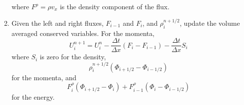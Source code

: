 \documentclass{article}
\begin{document}
\begin{enumerate}
\begin{equation}
	\end{equation}
	where $F^\rho = \rho v_x$ is the density component of the flux. 
	\item Given the left and right fluxes, $F_{i-1}$ and $F_{i}$, and $\rho_i^{n+1/2}$, update the volume averaged conserved variables. 
	For the momenta,
	\begin{equation}
		U_i^{n+1} = U_i^n - \frac{\Delta t}{\Delta x} \left(F_i - F_{i-1} \right) - \frac{\Delta t}{\Delta x} S_i
	\end{equation}
	where $S_i$ is zero for the density, 
	\begin{equation}
		\rho_i^{n+1/2} \left( \Phi_{i+1/2}-\Phi_{i-1/2} \right)
	\end{equation}
	for the momenta, and 
	\begin{equation}
		F_i^\rho \left(\Phi_{i+1/2}-\Phi_i\right) + F_{i-1}^\rho \left(\Phi_{i}-\Phi_{i-1/2}\right)
	\end{equation}
	for the energy. 


\end{enumerate}
\end{document}
